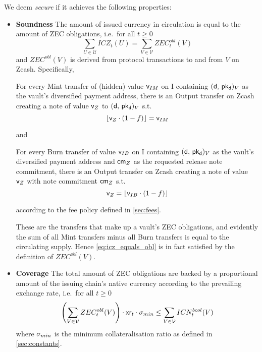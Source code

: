 We deem \zclaim \emph{secure} if it achieves the following properties:
\begin{itemize}
    \item \textbf{Soundness} The amount of issued currency in circulation is equal to the amount of ZEC obligations, i.e.\ for all $t \geq 0$
    \begin{equation}\label{eq:icz_equals_obl}
        \sum_{U \in \mathcal{U}} ICZ_t(U) = \sum_{V \in \mathcal{V}} ZEC^{obl}_t(V)
    \end{equation}
    and $ZEC^{obl}(V)$ is derived from protocol transactions to and from $V$ on Zcash.
    Specifically,
    \begin{lemma}\label{le:lock_before_mint}
        For every Mint transfer of (hidden) value $\mathsf{v}_{IM}$ on I containing $(\mathsf{d},\, \mathsf{pk_d})_V$ as the vault's diversified payment address, there is an Output transfer on Zcash creating a note of value $\mathsf{v}_Z$ to $(\mathsf{d},\, \mathsf{pk_d})_V$ s.t.
        \begin{equation}
            \left \lfloor{\val_Z \cdot (1 - f)}\right \rfloor = \val_{IM}
        \end{equation}
    \end{lemma}
    and
    \begin{lemma}\label{le:release_before_burn}
        For every Burn transfer of value $\mathsf{v}_{IB}$ on I containing $(\mathsf{d},\, \mathsf{pk_d})_V$ as the vault's diversified payment address and $\mathsf{cm}_Z$ as the requested release note commitment, there is an Output transfer on Zcash creating a note of value $\mathsf{v}_Z$ with note commitment $\mathsf{cm}_Z$ s.t.
        \begin{equation}
            \val_Z = \left \lfloor{\val_{IB} \cdot (1 - f)}\right \rfloor
        \end{equation}
    \end{lemma}
    according to the fee policy defined in \cref{sec:fees}.
    
    These are the transfers that make up a vault's ZEC obligations, and evidently the sum of all Mint transfers minus all Burn transfers is equal to the circulating supply.
    Hence \cref{eq:icz_equals_obl} is in fact satisfied by the definition of $ZEC^{obl}(V)$.
   
    \item \textbf{Coverage} The total amount of ZEC obligations are backed by a proportional amount of the issuing chain's native currency according to the prevailing exchange rate, i.e.\ for all $t \geq 0$
    \begin{equation}\label{eq:coverage}
        \left(\sum_{V \in \mathcal{V}} ZEC^{obl}_t(V)\right) \cdot \mathsf{xr}_t \cdot \sigma_{min} \leq \sum_{V \in \mathcal{V}} ICN^{bcol}_t(V)
    \end{equation}
    where $\sigma_{min}$ is the minimum collateralisation ratio as defined in \cref{sec:constants}.
    

\end{itemize}
